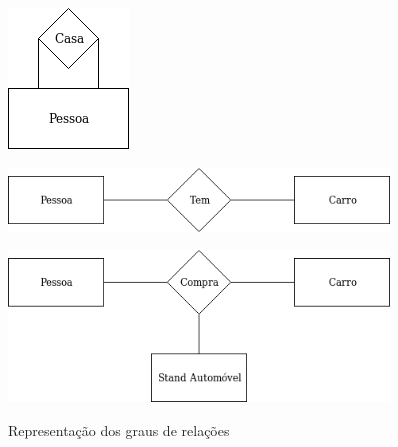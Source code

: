 \documentclass[11pt,twoside,a4paper]{report}
\begin{document}
\begin{figure}[H]
	\centering
	\begin{minipage}{0.5\textwidth}
		\vspace{-1cm}
		\begin{center}
			\includegraphics[width=.25\textwidth]{notacao3} %
			\label{fig:der31}
		\end{center}
	\end{minipage}%
	\begin{minipage}{0.5\textwidth}
		\begin{center}
			\includegraphics[width=0.9\textwidth]{notacao4} %
			\label{fig:der32}
		\end{center}
	\end{minipage}
	\begin{minipage}{0.5\textwidth}
		\vspace{1cm}
		\begin{center}
			\includegraphics[width=0.9\textwidth]{notacao5} %
			\label{fig:der33}
		\end{center}
	\end{minipage}
	\caption{Representação dos graus de relações}
	\label{fig:der3}
\end{figure}
\end{document}
